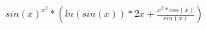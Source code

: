 \documentclass[32pt]{article}
\begin{document}
$sin(x)^{x^{2}}*(ln(sin(x))*2x+\frac{x^{2}*cos(x)}{sin(x)})$
\end{document}
